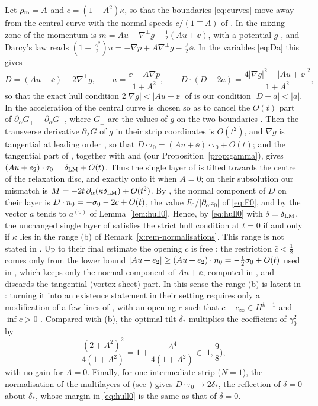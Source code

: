 \begin{remark}\label{x:rem-LM26-layer}
Let $\rho_{\mathrm m}=A$ and $c=(1-A^2)\kappa$, so that the boundaries \eqref{eq:curves} move away from the central curve with the normal speeds $c/(1\mp A)$ of \cite[(4.2)]{LM26}. In the mixing zone of
\cite{LM26} the momentum is $m=Au-\nabla^\perp g-\frac12(Au+\ee)$, with a potential $g$ \cite[(4.6)]{LM26}, and Darcy's law \cite[(4.10)]{LM26} reads
$(1+\frac{A^2}2)u=-\nabla p+A\nabla^\perp g-\frac A2\ee$. In the variables \eqref{eq:Da} this gives
\[
D=(Au+\ee)-2\nabla^\perp g,\qquad a=\frac{\ee-A\nabla p}{1+A^2},\qquad D\cdot(D-2a)=\frac{4|\nabla g|^2-|Au+\ee|^2}{1+A^2},
\]
so that the exact hull condition $2|\nabla g|<|Au+\ee|$ of \cite[(4.14)]{LM26} is our condition $|D-a|<|a|$. In \cite{LM26} the acceleration of the central curve is chosen so as to cancel
the $O(t)$ part of $\partial_\alpha G_+-\partial_\alpha G_-$, where $G_\pm$ are the values of $g$ on the two boundaries \cite[Sec.~3.3.4 and Lemma~5.3]{LM26}. Then the transverse
derivative $\partial_\lambda G$ of $g$ in their strip coordinates is $O(t^2)$, and $\nabla g$ is tangential at leading order \cite[Props.~7.2--7.3 and (7.9)]{LM26}, so that $D\cdot\tau_0=(Au+\ee)\cdot\tau_0+O(t)$; and the tangential part of \cite[(4.10)]{LM26},
together with \cite[(7.11)]{LM26} and \cite[(3.7b)]{LM26} (our Proposition~\ref{prop:gamma}), gives $(Au+e_2)\cdot\tau_0=\delta_{\rm LM}+O(t)$. Thus the single layer of \cite{LM26}
is tilted towards the centre of the relaxation disc, and exactly onto it when $A=0$; on their subsolution our mismatch is $M=-2t\,\partial_\alpha(\kappa\delta_{\rm LM})+O(t^2)$. By
\cite[(7.9)--(7.10)]{LM26}, the normal component of $D$ on their layer is $D\cdot n_0=-\sigma_0-2c+O(t)$, the value $F_0/|\partial_\alpha z_0|$ of \eqref{eq:F0}, and by
\cite[(7.11)]{LM26} the vector $a$ tends to $a^{(0)}$ of Lemma~\ref{lem:hull0}. Hence, by \eqref{eq:hull0} with $\delta=\delta_{\rm LM}$, the unchanged single layer of \cite{LM26} satisfies the strict hull condition at $t=0$ if and only if
$\kappa$ lies in the range (b) of Remark~\ref{x:rem-normalisations}. This range is not stated in \cite{LM26}. Up to their final estimate the opening $c$ is free \cite[(5.1)]{LM26}; the restriction
$\bar c<\frac12$ comes only from the lower bound $|Au+e_2|\ge(Au+e_2)\cdot n_0=-\frac12\sigma_0+O(t)$ used in \cite[Sec.~7.4]{LM26}, which keeps only the normal component of $Au+\ee$,
computed in \cite[Prop.~7.4]{LM26}, and discards the tangential (vortex-sheet) part. In this sense the range (b) is latent in \cite{LM26}: turning it into an existence statement in their setting
requires only a modification of a few lines of \cite[Sec.~7.4]{LM26}, with an opening $c$ such that $c-c_\infty\in H^{k-1}$ and $\inf c>0$ \cite[Sec.~4.1 and (5.1)]{LM26}. Compared with
(b), the optimal tilt $\delta_*$ multiplies the coefficient of $\gamma_0^2$ by
\[
\frac{(2+A^2)^2}{4(1+A^2)}=1+\frac{A^4}{4(1+A^2)}\in\Big[1,\frac98\Big),
\]
with no gain for $A=0$. Finally, for one intermediate strip ($N=1$), the normalisation of the multilayers of \cite[Sec.~7.5]{LM26} (see \cite[(8.38) and (8.43)]{LM26}) gives
$D\cdot\tau_0\to2\delta_*$, the reflection of $\delta=0$ about $\delta_*$, whose margin in \eqref{eq:hull0} is the same as that of $\delta=0$.
\end{remark}
